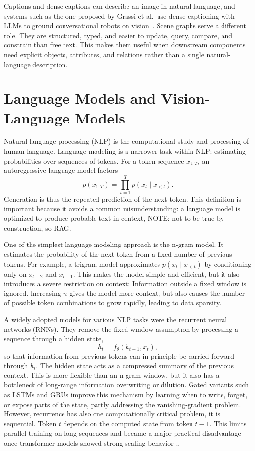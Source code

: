 Captions and dense captions can describe an image in natural language, and systems such as the one proposed by Grassi et al.\ use dense captioning with LLMs to ground conversational robots on vision~\cite{grassi_grounding_2024}. Scene graphs serve a different role. They are structured, typed, and easier to update, query, compare, and constrain than free text. This makes them useful when downstream components need explicit objects, attributes, and relations rather than a single natural-language description.

\section{Language Models and Vision-Language Models}\label{sec:llms-vlms}

Natural language processing (NLP) is the computational study and processing of human language. Language modeling is a narrower task within NLP: estimating probabilities over sequences of tokens. For a token sequence \(x_{1:T}\), an autoregressive language model factors
\[
p(x_{1:T})=\prod_{t=1}^{T}p(x_t\mid x_{<t}).
\]
Generation is thus the repeated prediction of the next token. This definition is important because it avoids a common misunderstanding: a language model is optimized to produce probable text in context, NOTE: not to be true by construction, so RAG.

One of the simplest language modeling approach is the n-gram model. It estimates the probability of the next token from a fixed number of previous tokens. For example, a trigram model approximates \(p(x_t\mid x_{<t})\) by conditioning only on \(x_{t-2}\) and \(x_{t-1}\). This makes the model simple and efficient, but it also introduces a severe restriction on context; Information outside a fixed window is ignored. Increasing \(n\) gives the model more context, but also causes the number of possible token combinations to grow rapidly, leading to data sparsity.

A widely adopted models for various NLP tasks were the recurrent neural networks (RNNs). They remove the fixed-window assumption by processing a sequence through a hidden state,
\[
h_t = f_\theta(h_{t-1}, x_t),
\]
so that information from previous tokens can in principle be carried forward through \(h_t\). The hidden state acts as a compressed summary of the previous context. This is more flexible than an n-gram window, but it also has a bottleneck of long-range information overwriting or dilution. Gated variants such as LSTMs and GRUs improve this mechanism by learning when to write, forget, or expose parts of the state, partly addressing the vanishing-gradient problem. However, recurrence has also one computationally critical problem, it is sequential. Token \(t\) depends on the computed state from token \(t-1\). This limits parallel training on long sequences and became a major practical disadvantage once transformer models showed strong scaling behavior \parencites[441--442]{lecun_deep_2015}[370, 372--376]{Goodfellow-et-al-2016}..

